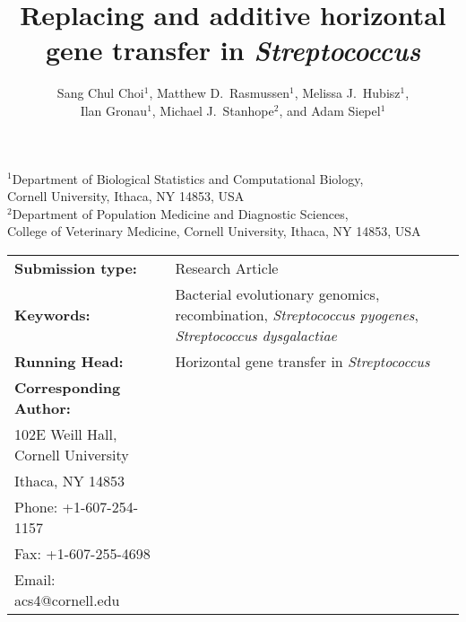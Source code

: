 \documentclass[12pt]{article}
\begin{document}
\begin{titlepage}

\title{Replacing and additive horizontal \\
gene transfer in {\em Streptococcus} }

\author{Sang Chul Choi$^{1}$, Matthew D.\ Rasmussen$^{1}$, 
Melissa J.\ Hubisz$^{1}$, \\
Ilan Gronau$^{1}$,
Michael J.\ Stanhope$^{2}$, and Adam Siepel$^{1}$}

\date{ }
\maketitle

\begin{footnotesize}
\begin{center}
$^1$Department of Biological Statistics and Computational Biology,\\
Cornell University, Ithaca, NY 14853, USA
\\[1ex]
$^2$Department of Population Medicine and Diagnostic Sciences,\\
College of Veterinary Medicine, Cornell University, Ithaca, NY 14853, USA
\\
\end{center}
\end{footnotesize}

\vspace{1in}

\begin{tabular}{lp{4.5in}}
{\bf Submission type:}& Research Article
\vspace{1ex}\\
{\bf Keywords:}&Bacterial evolutionary
genomics, recombination, {\em Streptococcus pyogenes}, {\em Streptococcus
  dysgalactiae} 
\vspace{1ex}\\
{\bf Running Head:}&Horizontal gene transfer in {\em Streptococcus}
\vspace{1ex}\\ 
{\bf Corresponding Author:}&
\begin{minipage}[t]{4in}
 Adam Siepel\\
 102E Weill Hall, Cornell University\\
 Ithaca, NY 14853\\
 Phone: +1-607-254-1157\\
 Fax: +1-607-255-4698\\
 Email: acs4@cornell.edu
\end{minipage}
\end{tabular}

\thispagestyle{empty}
\end{titlepage}
\end{document}
